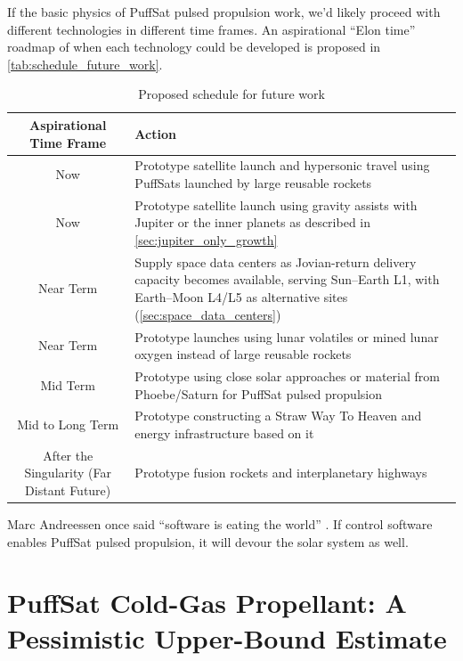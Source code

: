 \documentclass{article}
\begin{document}
If the basic physics of PuffSat pulsed propulsion work, we'd likely proceed with different technologies in different time frames. An aspirational ``Elon time'' \cite{isaacson2023musk,benzinga2023elontime} roadmap of when each technology could be developed is proposed in \autoref{tab:schedule_future_work}.


\begin{table}[htpb]
    \centering
    \begin{tabularx}{\textwidth}{|c|L|}\hline
        \textbf{Aspirational Time Frame} & \textbf{Action} \\\hline
        Now & Prototype satellite launch and hypersonic travel using PuffSats launched by large reusable rockets\\\hline
        Now & Prototype satellite launch using gravity assists with Jupiter or the inner planets as described in \autoref{sec:jupiter_only_growth} \\\hline
        Near Term & Supply space data centers as Jovian-return delivery capacity becomes available, serving Sun--Earth L1, with Earth--Moon L4/L5 as alternative sites (\autoref{sec:space_data_centers}) \\\hline
        Near Term & Prototype launches using lunar volatiles or mined lunar oxygen instead of large reusable rockets \\\hline
        Mid Term & Prototype using close solar approaches or material from Phoebe/Saturn for PuffSat pulsed propulsion \\\hline
        Mid to Long Term & Prototype constructing a Straw Way To Heaven and energy infrastructure based on it \\\hline
        After the Singularity (Far Distant Future) & Prototype fusion rockets and interplanetary highways \\\hline
    \end{tabularx}
    \caption{Proposed schedule for future work}
    \label{tab:schedule_future_work}
\end{table}

Marc Andreessen once said ``software is eating the world'' \cite{andreessen_software}. If control software enables PuffSat pulsed propulsion, it will devour the solar system as well.

\appendix 

\section{PuffSat Cold-Gas Propellant: A Pessimistic Upper-Bound Estimate}\label{sec:estimate_cold_gas}
\end{document}
